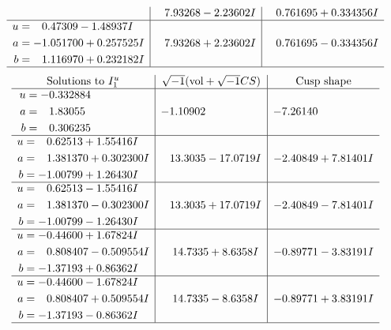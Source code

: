 \documentclass[1p]{elsarticle_modified}
\theoremstyle{definition}
\newcommand{\I}{\sqrt{-1}}
\begin{document}
$$\begin{array}{c|c|c}
 & \phantom{-}7.93268 - 2.23602 I & \phantom{-}0.761695 + 0.334356 I \\ \hline\begin{aligned}
u &= \phantom{-}0.47309 - 1.48937 I \\
a &= -1.051700 + 0.257525 I \\
b &= \phantom{-}1.116970 + 0.232182 I\end{aligned}
 & \phantom{-}7.93268 + 2.23602 I & \phantom{-}0.761695 - 0.334356 I\\
 \hline 
 \end{array}$$\newpage$$\begin{array}{c|c|c}  
\text{Solutions to }I^u_{1}& \I (\text{vol} + \sqrt{-1}CS) & \text{Cusp shape}\\
 \hline 
\begin{aligned}
u &= -0.332884\phantom{ +0.000000I} \\
a &= \phantom{-}1.83055\phantom{ +0.000000I} \\
b &= \phantom{-}0.306235\phantom{ +0.000000I}\end{aligned}
 & -1.10902\phantom{ +0.000000I} & -7.26140\phantom{ +0.000000I} \\ \hline\begin{aligned}
u &= \phantom{-}0.62513 + 1.55416 I \\
a &= \phantom{-}1.381370 + 0.302300 I \\
b &= -1.00799 + 1.26430 I\end{aligned}
 & \phantom{-}13.3035 - 17.0719 I & -2.40849 + 7.81401 I \\ \hline\begin{aligned}
u &= \phantom{-}0.62513 - 1.55416 I \\
a &= \phantom{-}1.381370 - 0.302300 I \\
b &= -1.00799 - 1.26430 I\end{aligned}
 & \phantom{-}13.3035 + 17.0719 I & -2.40849 - 7.81401 I \\ \hline\begin{aligned}
u &= -0.44600 + 1.67824 I \\
a &= \phantom{-}0.808407 - 0.509554 I \\
b &= -1.37193 + 0.86362 I\end{aligned}
 & \phantom{-}14.7335 + 8.6358 I & -0.89771 - 3.83191 I \\ \hline\begin{aligned}
u &= -0.44600 - 1.67824 I \\
a &= \phantom{-}0.808407 + 0.509554 I \\
b &= -1.37193 - 0.86362 I\end{aligned}
 & \phantom{-}14.7335 - 8.6358 I & -0.89771 + 3.83191 I\\
 \hline 
 \end{array}$$\newpage\newpage\renewcommand{\arraystretch}{1}
\end{document}
